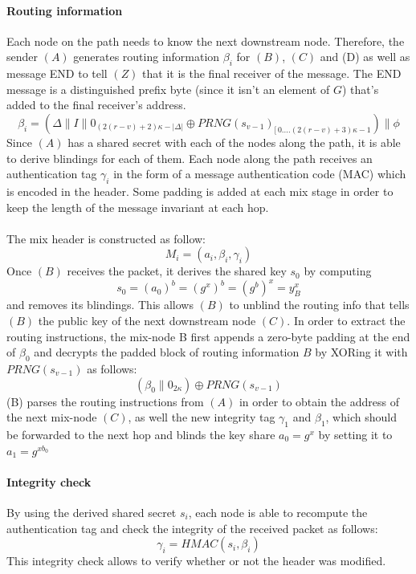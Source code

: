 \paragraph{Routing information}
Each node on the path needs to know the next downstream node. Therefore, the sender $(A)$ generates routing information $\beta_i$ for $(B)$, $(C)$ and (D) as well as message END to tell $(Z)$ that it is the final receiver of the message. The END message is a distinguished prefix byte (since it isn't an element of $G$) that's added to the final receiver's address.
$$\beta_i=(\Delta\|I\|0_{(2(r-v)+2)\kappa-|\Delta|}\oplus PRNG(s_{v-1})_{[ \,0....(2(r-v)+3)\kappa-1})\|\phi$$
\newline Since $(A)$ has a shared secret with each of the nodes along the path, it is able to derive blindings for each of them. 
\newline Each node along the path receives an authentication tag $\gamma_i$ in the form of a message authentication code (MAC)
which is encoded in the header.
\newline Some padding is added at each mix stage in order to keep the length of the message invariant at each hop. 
\\~\\The mix header is constructed as follow: $$M_i=(a_i,\beta_i,\gamma_i)$$ 
\newline Once $(B)$ receives the packet, it derives the shared key $s_0$ by computing $$s_0=(a_0)^b=(g^x)^b=(g^b)^x=y^x_B$$ and removes its blindings. This allows $(B)$ to unblind the routing info that tells $(B)$ the public key of the next downstream node $(C)$. In order to extract the routing instructions, the mix-node B first appends a zero-byte padding at the end of $\beta_0$ and decrypts the padded block of routing information $B$ by XORing it with $PRNG(s_{v-1})$ as follows:
$$(\beta_0\|0_{2\kappa})\oplus PRNG(s_{v-1})$$
(B) parses the routing instructions from $(A)$ in order to obtain the address of the next mix-node $(C)$, as well the new integrity tag $\gamma_1$ and $\beta_1$, which should be forwarded to the next hop and blinds the key share $a_0=g^x$ by setting it to $a_1=g^{xb_0}$
\paragraph{Integrity check}
By using the derived shared secret $s_i$, each node is able to recompute the authentication tag and check the integrity of the received packet as follows: $$\gamma_i=HMAC(s_i,\beta_i)$$
This integrity check allows to verify whether or not the header was modified.

